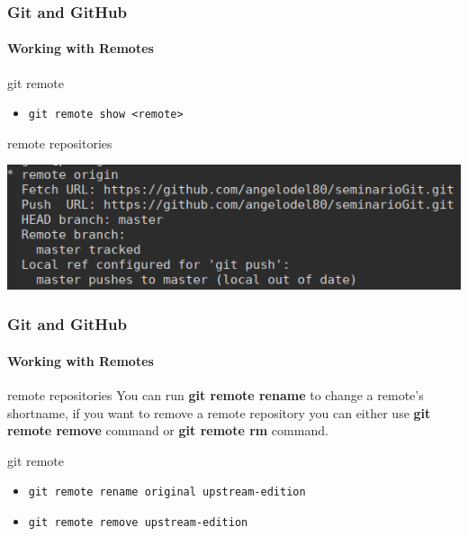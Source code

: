 \begin{frame}
	\frametitle{Git and GitHub}
    \framesubtitle{Working with Remotes}
    \addtocounter{nframe}{1}


	\begin{block}{git remote}
		\begin{itemize}
			\item \texttt{git remote show <remote>}
		\end{itemize}
	\end{block}


	\begin{block}{remote repositories}
		\begin{center}
			\includegraphics[width=.9\textwidth]{imgs/git-remote-show}
		\end{center}
	\end{block}

\end{frame}

\begin{frame}
	\frametitle{Git and GitHub}
    \framesubtitle{Working with Remotes}
    \addtocounter{nframe}{1}

	\begin{block}{remote repositories}
		You can run \textbf{git remote rename} to change a remote’s shortname, if you want to remove a remote repository you can either use \textbf{git remote remove} command or \textbf{git remote rm} command. 

	\end{block}

	\begin{block}{git remote}
		\begin{itemize}
			\item \texttt{git remote rename original upstream-edition}
			\item \texttt{git remote remove upstream-edition}
		\end{itemize}
	\end{block}

\end{frame}

